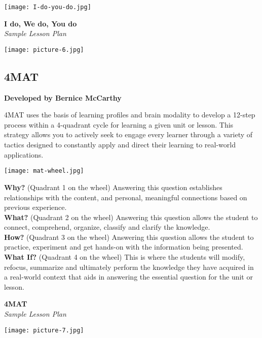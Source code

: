 \begin{center}
\texttt{[image: I-do-you-do.jpg]} 
\end{center}

\newpage
\begin{center}
\textbf{I do, We do, You do }\\
\textit{Sample Lesson Plan}
\end{center}

\begin{center}
\texttt{[image: picture-6.jpg]} 
\end{center}

\newpage
\begin{center}
\section{4MAT}
\textbf{Developed by Bernice McCarthy}\\
\end{center}


4MAT uses the basis of learning profiles and brain modality to develop a 12-step process within a 4-quadrant cycle for learning a given unit or lesson.  This strategy allows you to actively seek to engage every learner through a variety of tactics designed to constantly apply and direct their learning to real-world applications.


\begin{center}
\texttt{[image: mat-wheel.jpg]} 
\end{center}

\begin{flushleft}
\textbf{Why?} (Quadrant 1 on the wheel)
Answering this question establishes relationships with the content, and personal, meaningful connections based on previous experience.\\

\textbf{What?} (Quadrant 2 on the wheel)
Answering this question allows the student to connect, comprehend, organize, classify and clarify the knowledge.\\

\textbf{How?} (Quadrant 3 on the wheel)
Answering this question allows the student to practice, experiment and get hands-on with the information being presented.\\

\textbf{What If?} (Quadrant 4 on the wheel)
This is where the students will modify, refocus, summarize and ultimately perform the knowledge they have acquired in a real-world context that aids in answering the essential question for the unit or lesson.\\

\end{flushleft}

\newpage
\begin{center}
\textbf{4MAT }\\
\textit{Sample Lesson Plan}
\end{center}

\begin{center}
\texttt{[image: picture-7.jpg]} 
\end{center}